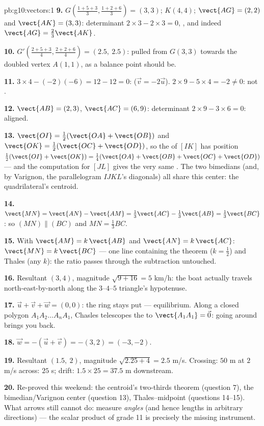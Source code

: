 \begin{solution}{pb:g10:vectors:1}
\textbf{9.} $G\left(\frac{1+5+3}{3}, \frac{1+2+6}{3}\right) =
(3, 3)$; $K(4, 4)$; $\vect{AG} = (2, 2)$ and
$\vect{AK} = (3, 3)$: determinant
$2 \times 3 - 2 \times 3 = 0$, , and indeed
$\vect{AG} = \frac23\vect{AK}$.

\textbf{10.} $G'\left(\frac{2 + 5 + 3}{4}, \frac{2 + 2 +
6}{4}\right) = (2.5,\ 2.5)$: pulled from $G(3,3)$ towards the
doubled vertex $A(1,1)$, as a balance point should be.

\textbf{11.} $3 \times 4 - (-2)(-6) = 12 - 12 = 0$: 
($\vec v = -2\vec u$). $2 \times 9 - 5 \times 4 = -2 \neq 0$:
not .

\textbf{12.} $\vect{AB} = (2, 3)$, $\vect{AC} = (6, 9)$:
determinant $2 \times 9 - 3 \times 6 = 0$: aligned.

\textbf{13.} $\vect{OI} = \frac12(\vect{OA} + \vect{OB})$ and
$\vect{OK} = \frac12(\vect{OC} + \vect{OD})$, so the 
of $[IK]$ has position 
$\frac12(\vect{OI} + \vect{OK}) = \frac14(\vect{OA} +
\vect{OB} + \vect{OC} + \vect{OD})$ --- and the computation
for $[JL]$ gives the very same . The two bimedians (and,
by Varignon, the parallelogram $IJKL$'s diagonals) all share
this center: the quadrilateral's centroid.

\textbf{14.} $\vect{MN} = \vect{AN} - \vect{AM} =
\frac13\vect{AC} - \frac13\vect{AB} = \frac13\vect{BC}$:
so $(MN) \parallel (BC)$ and $MN = \frac13 BC$.

\textbf{15.} With $\vect{AM} = k\,\vect{AB}$ and
$\vect{AN} = k\,\vect{AC}$: $\vect{MN} = k\,\vect{BC}$ --- one
line containing the  theorem ($k = \frac12$) and
Thales (any $k$): the ratio passes through the subtraction
untouched.

\textbf{16.} Resultant $(3, 4)$, magnitude
$\sqrt{9 + 16} = 5$ km/h: the boat actually travels
north-east-by-north along the $3$--$4$--$5$ triangle's
hypotenuse.

\textbf{17.} $\vec u + \vec v + \vec w = (0, 0)$: the ring
stays put --- equilibrium. Along a closed polygon
$A_1 A_2 \dots A_n A_1$, Chasles telescopes the  to
$\vect{A_1 A_1} = \vec 0$: going around brings you back.

\textbf{18.} $\vec w = -(\vec u + \vec v) = -(3, 2) =
(-3, -2)$.

\textbf{19.} Resultant $(1.5,\ 2)$, magnitude
$\sqrt{2.25 + 4} = 2.5$ m/s. Crossing: $50$ m at $2$ m/s
across: $25$ s; drift: $1.5 \times 25 = 37.5$ m downstream.

\textbf{20.} Re-proved this weekend: the centroid's two-thirds
theorem (question 7), the bimedian/Varignon center (question
13), Thales--midpoint (questions 14--15). What arrows still
cannot do: measure \emph{angles} (and hence lengths in
arbitrary directions) --- the scalar product of grade 11 is
precisely the missing instrument.
\end{solution}
